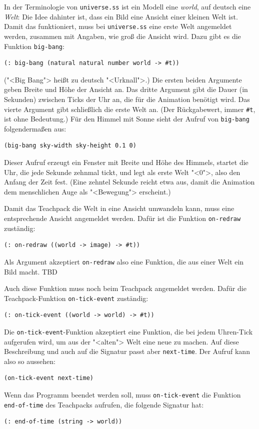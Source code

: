 In der Terminologie von \texttt{universe.ss} ist ein Modell eine
\textit{world}, auf deutsch eine \textit{Welt}: Die Idee dahinter
ist, dass ein Bild eine Ansicht einer kleinen Welt ist.  Damit das
funktioniert, muss bei \texttt{universe.ss} eine erste Welt angemeldet
werden, zusammen mit Angaben, wie groß die Ansicht wird.  Dazu gibt es
die Funktion \texttt{big-bang}:
%
\begin{lstlisting}
(: big-bang (natural natural number world -> #t))
\end{lstlisting}
%
("<Big Bang"> heißt zu deutsch "<Urknall">.)
Die ersten beiden Argumente geben Breite und Höhe der Ansicht an.  Das
dritte Argument gibt die Dauer (in Sekunden) zwischen Ticks der Uhr
an, die für die Animation benötigt wird.  Das vierte Argument gibt
schließlich die erste Welt an.  (Der Rückgabewert, immer
\lstinline{#t}, ist ohne Bedeutung.)  Für den Himmel mit
Sonne sieht der Aufruf von \texttt{big-bang} folgendermaßen aus:
%
\begin{lstlisting}
(big-bang sky-width sky-height 0.1 0)
\end{lstlisting}
%
Dieser Aufruf erzeugt ein Fenster mit Breite und Höhe des Himmels,
startet die Uhr, die jede Sekunde zehnmal tickt, und legt als erste
Welt "<0">, also den Anfang der Zeit fest.  (Eine zehntel Sekunde
reicht etwa aus, damit die Animation dem menschlichen Auge als
"<Bewegung"> erscheint.)

Damit das Teachpack die Welt in eine Ansicht umwandeln kann, muss eine
entsprechende Ansicht angemeldet werden.  Dafür ist die Funktion
\texttt{on-redraw} zuständig:
%
\begin{lstlisting}
(: on-redraw ((world -> image) -> #t))
\end{lstlisting}
%
Als Argument akzeptiert \texttt{on-redraw} also eine Funktion, die aus
einer Welt ein Bild macht.  TBD

Auch diese Funktion muss noch beim Teachpack angemeldet werden.  Dafür
die Teachpack-Funktion
\texttt{on-tick-event}
zuständig:
%
\begin{lstlisting}
(: on-tick-event ((world -> world) -> #t))
\end{lstlisting}
%
Die \texttt{on-tick-event}-Funktion akzeptiert eine Funktion, die bei
jedem Uhren-Tick aufgerufen wird, um aus der "<alten"> Welt eine neue
zu machen.  Auf diese Beschreibung und auch auf die Signatur
passt aber \texttt{next-time}.  Der Aufruf kann also so aussehen:
%
\begin{lstlisting}
(on-tick-event next-time)
\end{lstlisting}
%
Wenn das Programm
beendet werden soll, muss \texttt{on-tick-event} die Funktion
\texttt{end-of-time} des
Teachpacks aufrufen, die folgende Signatur hat:
%
\begin{lstlisting}
(: end-of-time (string -> world))
\end{lstlisting}
%

